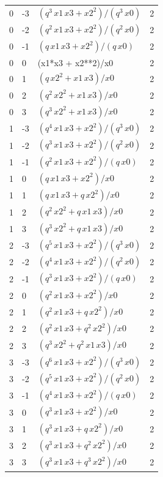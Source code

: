 \documentclass[10pt]{article}
\begin{document}
{\begin{longtable}{@{}llll@{}}
0 & -3 & $(q^{3}\,x1\,x3 + x2^{2})/(q^{3}\,x0)$ & 2 \\
0 & -2 & $(q^{2}\,x1\,x3 + x2^{2})/(q^{2}\,x0)$ & 2 \\
0 & -1 & $(q\,x1\,x3 + x2^{2})/(q\,x0)$ & 2 \\
0 & 0 & (x1*x3 + x2**2)/x0 & 2 \\
0 & 1 & $(q\,x2^{2} + x1\,x3)/x0$ & 2 \\
0 & 2 & $(q^{2}\,x2^{2} + x1\,x3)/x0$ & 2 \\
0 & 3 & $(q^{3}\,x2^{2} + x1\,x3)/x0$ & 2 \\
1 & -3 & $(q^{4}\,x1\,x3 + x2^{2})/(q^{3}\,x0)$ & 2 \\
1 & -2 & $(q^{3}\,x1\,x3 + x2^{2})/(q^{2}\,x0)$ & 2 \\
1 & -1 & $(q^{2}\,x1\,x3 + x2^{2})/(q\,x0)$ & 2 \\
1 & 0 & $(q\,x1\,x3 + x2^{2})/x0$ & 2 \\
1 & 1 & $(q\,x1\,x3 + q\,x2^{2})/x0$ & 2 \\
1 & 2 & $(q^{2}\,x2^{2} + q\,x1\,x3)/x0$ & 2 \\
1 & 3 & $(q^{3}\,x2^{2} + q\,x1\,x3)/x0$ & 2 \\
2 & -3 & $(q^{5}\,x1\,x3 + x2^{2})/(q^{3}\,x0)$ & 2 \\
2 & -2 & $(q^{4}\,x1\,x3 + x2^{2})/(q^{2}\,x0)$ & 2 \\
2 & -1 & $(q^{3}\,x1\,x3 + x2^{2})/(q\,x0)$ & 2 \\
2 & 0 & $(q^{2}\,x1\,x3 + x2^{2})/x0$ & 2 \\
2 & 1 & $(q^{2}\,x1\,x3 + q\,x2^{2})/x0$ & 2 \\
2 & 2 & $(q^{2}\,x1\,x3 + q^{2}\,x2^{2})/x0$ & 2 \\
2 & 3 & $(q^{3}\,x2^{2} + q^{2}\,x1\,x3)/x0$ & 2 \\
3 & -3 & $(q^{6}\,x1\,x3 + x2^{2})/(q^{3}\,x0)$ & 2 \\
3 & -2 & $(q^{5}\,x1\,x3 + x2^{2})/(q^{2}\,x0)$ & 2 \\
3 & -1 & $(q^{4}\,x1\,x3 + x2^{2})/(q\,x0)$ & 2 \\
3 & 0 & $(q^{3}\,x1\,x3 + x2^{2})/x0$ & 2 \\
3 & 1 & $(q^{3}\,x1\,x3 + q\,x2^{2})/x0$ & 2 \\
3 & 2 & $(q^{3}\,x1\,x3 + q^{2}\,x2^{2})/x0$ & 2 \\
3 & 3 & $(q^{3}\,x1\,x3 + q^{3}\,x2^{2})/x0$ & 2 \\
\bottomrule
\end{longtable}}
\end{document}
